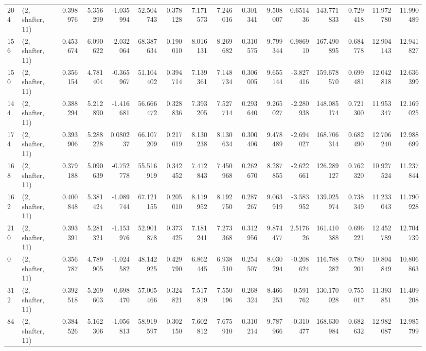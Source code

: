 \begin{tabular}{llrrrrrrrrrrrrrr}
204 &  (2, shafter, 11) &   0.398976 &   5.356299 &  -1.035994 &    52.504743 &   0.378128 &   7.171573 &   7.246016 &  0.301341 &   9.508007 &   0.651436 &   143.771833 &  0.729418 &  11.972780 &  11.990489 \\
156 &  (2, shafter, 11) &   0.453674 &   6.090622 &  -2.032064 &    68.387634 &   0.190010 &   8.016131 &   8.269682 &  0.310575 &   9.799344 &   0.986910 &   167.490895 &  0.684778 &  12.904143 &  12.941827 \\
150 &  (2, shafter, 11) &   0.356154 &   4.781404 &  -0.365967 &    51.104402 &   0.394714 &   7.139361 &   7.148734 &  0.306005 &   9.655144 &  -3.827416 &   159.678570 &  0.699481 &  12.042818 &  12.636399 \\
144 &  (2, shafter, 11) &   0.388294 &   5.212890 &  -1.416681 &    56.666472 &   0.328836 &   7.393205 &   7.527714 &  0.293640 &   9.265027 &  -2.280938 &   148.085174 &  0.721300 &  11.953347 &  12.169025 \\
174 &  (2, shafter, 11) &   0.393906 &   5.288228 &   0.080237 &    66.107209 &   0.217019 &   8.130238 &   8.130634 &  0.300406 &   9.478489 &  -2.694027 &   168.706314 &  0.682490 &  12.706240 &  12.988699 \\
168 &  (2, shafter, 11) &   0.379188 &   5.090639 &  -0.752778 &    55.516919 &   0.342452 &   7.412843 &   7.450968 &  0.262670 &   8.287855 &  -2.622661 &   126.289127 &  0.762320 &  10.927524 &  11.237844 \\
162 &  (2, shafter, 11) &   0.400848 &   5.381424 &  -1.089744 &    67.121155 &   0.205010 &   8.119952 &   8.192750 &  0.287267 &   9.063919 &  -3.583952 &   139.025974 &  0.738349 &  11.233043 &  11.790928 \\
210 &  (2, shafter, 11) &   0.393391 &   5.281321 &  -1.153976 &    52.901878 &   0.373425 &   7.181241 &   7.273368 &  0.312956 &   9.874477 &   2.517626 &   161.410388 &  0.696221 &  12.452789 &  12.704739 \\
0   &  (2, shafter, 11) &   0.356787 &   4.789905 &  -1.024582 &    48.142925 &   0.429790 &   6.862445 &   6.938510 &  0.254507 &   8.030294 &  -0.208624 &   116.788282 &  0.780201 &  10.804849 &  10.806863 \\
312 &  (2, shafter, 11) &   0.392518 &   5.269603 &  -0.698470 &    57.005466 &   0.324821 &   7.517819 &   7.550196 &  0.268324 &   8.466253 &  -0.591762 &   130.170028 &  0.755017 &  11.393851 &  11.409208 \\
84  &  (2, shafter, 11) &   0.384526 &   5.162306 &  -1.056813 &    58.919597 &   0.302150 &   7.602812 &   7.675910 &  0.310214 &   9.787966 &  -0.310477 &   168.630984 &  0.682632 &  12.982087 &  12.985799 \\

\end{tabular}
